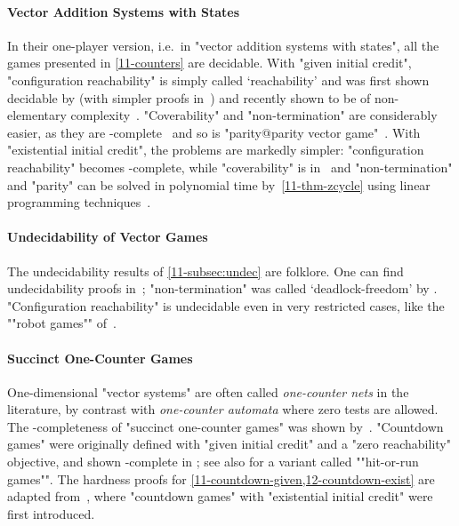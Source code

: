 \paragraph{Vector Addition Systems with States}
In their one-player version, i.e.\ in "vector addition systems with
states", all the games presented in \cref{11-counters} are decidable.
With "given initial credit", "configuration reachability" is simply
called `reachability' and was first shown decidable by
 (with simpler proofs
in~\cite{Kosaraju:1982,Lambert:1992,Leroux:2011}) and recently shown
to be of non-elementary complexity~\cite{Czerwinski&Lasota&Lazic&Leroux&Mazowiecki:2019}.  "Coverability" and
"non-termination" are considerably easier, as they are
\EXPSPACE-complete~\cite{Lipton:1976,Rackoff:1978} and so is
"parity@parity vector game"~\cite{Habermehl:1997}.  With "existential
initial credit", the problems are markedly simpler: "configuration
reachability" becomes \EXPSPACE-complete, while "coverability" is in
\NL\ and "non-termination" and "parity" can be solved in polynomial
time by~\cref{11-thm-zcycle} using linear programming
techniques~\cite{Kosaraju&Sullivan:1988}.

\paragraph{Undecidability of Vector Games}
The undecidability results of \cref{11-subsec:undec} are folklore.  One
can find undecidability proofs
in~\cite{Abdulla&Bouajjani&dOrso:2003,Raskin&Samuelides&VanBegin:2005};
"non-termination" was called `deadlock-freedom' by . "Configuration reachability" is
undecidable even in very restricted cases, like the ""robot games""
of~\citet{Niskanen&Potapov&Reichert:2016}.

\paragraph{Succinct One-Counter Games}
One-dimensional "vector systems" are often called \emph{one-counter
nets} in the literature, by contrast with \emph{one-counter automata}
where zero tests are allowed.  The \EXPSPACE-completeness of "succinct
one-counter games" was shown by~.  "Countdown games"
were originally defined with "given initial credit" and a "zero
reachability" objective, and shown
\EXP-complete in \cite{Jurdzinski&Laroussinie&Sproston:2008}; see also
\citet{Kiefer:2013} for a variant called ""hit-or-run games"".  The
hardness proofs for \cref{11-countdown-given,12-countdown-exist} are
adapted from~\citet{Jancar&Osicka&Sawa:2018}, where "countdown games"
with "existential initial credit" were first introduced.

